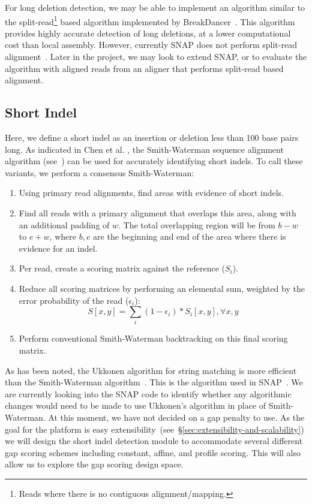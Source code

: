\documentclass[11pt]{article}
\begin{document}
For long deletion detection, we may be able to implement an algorithm similar to the split-read\footnote{Reads where
there is no contiguous alignment/mapping.} based algorithm implemented by BreakDancer~\cite{chen09}. This
algorithm provides highly accurate detection of long deletions, at a lower computational cost than local assembly.
However, currently SNAP does not perform split-read alignment~\cite{zaharia11}. Later in the project, we may
look to extend SNAP, or to evaluate the algorithm with aligned reads from an aligner that performs split-read based
alignment.

\subsection{Short Indel}
\label{sec:short-indel}

Here, we define a short indel as an insertion or deletion less than 100 base pairs long. As indicated in Chen et al.
\cite{chen09}, the Smith-Waterman sequence alignment algorithm (see~\cite{smith81}) can be used for accurately
identifying short indels. To call these variants, we perform a consensus Smith-Waterman:

\begin{enumerate}
\item Using primary read alignments, find areas with evidence of short indels.
\item Find all reads with a primary alignment that overlaps this area, along with an additional padding of $w$. The total
overlapping region will be from $b - w$ to $e + w$, where $b, e$ are the beginning and end of the area where there is
evidence for an indel.
\item Per read, create a scoring matrix against the reference ($S_i$).
\item Reduce all scoring matrices by performing an elemental sum, weighted by the error probability of the read
($\epsilon_i$):
$$
S [x, y] = \sum_i (1 - \epsilon_i) * S_i [x,y] , \forall x, y
$$
\item Perform conventional Smith-Waterman backtracking on this final scoring matrix.
\end{enumerate}

As has been noted, the Ukkonen algorithm for string matching is more efficient than the Smith-Waterman
algorithm~\cite{ukkonen85}. This is the algorithm used in SNAP~\cite{zaharia11}. We are currently looking into the SNAP
code to identify whether any algorithmic changes would need to be made to use Ukkonen's algorithm in place of
Smith-Waterman. At this moment, we have not decided on a gap penalty to use. As the goal for the platform is easy
extensibility~(see~\S\ref{sec:extensibility-and-scalability}) we will design the short indel detection module to
accommodate several different gap scoring schemes including constant, affine, and profile scoring. This will also allow
us to explore the gap scoring design space.
\end{document}
